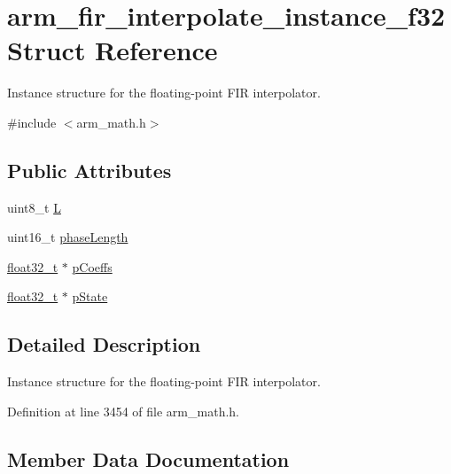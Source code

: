 \hypertarget{structarm__fir__interpolate__instance__f32}{}\section{arm\+\_\+fir\+\_\+interpolate\+\_\+instance\+\_\+f32 Struct Reference}
\label{structarm__fir__interpolate__instance__f32}


Instance structure for the floating-\/point F\+IR interpolator.  




{\ttfamily \#include $<$arm\+\_\+math.\+h$>$}

\subsection*{Public Attributes}
\begin{DoxyCompactItemize}
\item 
uint8\+\_\+t \hyperlink{structarm__fir__interpolate__instance__f32_ae6f94dcc0ccd8aa4bc699b20985d9df5}{L}
\item 
uint16\+\_\+t \hyperlink{structarm__fir__interpolate__instance__f32_a389e669e13ec56292a70db8e92194b12}{phase\+Length}
\item 
\hyperlink{arm__math_8h_a4611b605e45ab401f02cab15c5e38715}{float32\+\_\+t} $\ast$ \hyperlink{structarm__fir__interpolate__instance__f32_a86053b715980a93c9df630d6de5bb63c}{p\+Coeffs}
\item 
\hyperlink{arm__math_8h_a4611b605e45ab401f02cab15c5e38715}{float32\+\_\+t} $\ast$ \hyperlink{structarm__fir__interpolate__instance__f32_a42a8ba1bda85fa86d7b6c84d3da4c75b}{p\+State}
\end{DoxyCompactItemize}


\subsection{Detailed Description}
Instance structure for the floating-\/point F\+IR interpolator. 

Definition at line 3454 of file arm\+\_\+math.\+h.



\subsection{Member Data Documentation}
\mbox{\label{structarm__fir__interpolate__instance__f32_ae6f94dcc0ccd8aa4bc699b20985d9df5}} 
